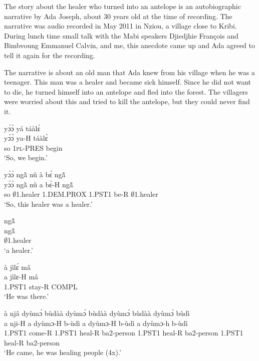 The story about the healer who turned into an antelope is an autobiographic narrative by Ada Joseph, about 30 years old at the time of recording. The narrative was audio recorded in May 2011 in Nziou, a village close to Kribi. During lunch time small talk with the Mabi speakers Djiedjhie François and Bimbvoung Emmanuel Calvin, and me, this anecdote came up and Ada agreed to tell it again for the recording. 

The narrative is about an old man that Ada knew from his village when he was a teenager. This man was a healer and became sick himself. Since he did not want to die, he turned himself into an antelope and fled into the forest. The villagers were worried about this and tried to kill the  antelope, but they could never find it.


\begin{exe} 
\exA\label{01}
  \glll    yɔ́ɔ̀ yá táàlɛ̀  \\
          yɔ́ɔ̀ ya-H táàlɛ̀  \\
            so 1\textsc{pl}-PRES begin     \\
    \trans `So, we begin.'
\end{exe}

\begin{exe} 
\exA\label{02}
  \glll   yɔ́ɔ̀ ngã̀ nû à bɛ́ ngã̂  \\
          yɔ́ɔ̀ ngã̀ nû a bɛ̀-H ngã̂ \\
         so $\emptyset$1.healer 1.DEM.PROX 1.PST1 be-R $\emptyset$1.healer   \\
    \trans `So, this healer was a healer.'
\end{exe}

\begin{exe} 
\exA\label{03}
  \glll  ngã̂    \\
          ngã̂   \\
          $\emptyset$1.healer       \\
    \trans `a healer.'
\end{exe}

\begin{exe} 
\exA\label{04}
  \glll  à jìlɛ́ mâ   \\
          a jìlɛ-H mâ   \\
         1.PST1 stay-R  COMPL       \\
    \trans `He was there.'
\end{exe}

\begin{exe} 
\exA\label{05}
  \glll  à njâ dyùmɔ́ bùdàà dyùmɔ́ bùdàà dyùmɔ́ bùdàà dyùmɔ́ bùdì  \\
           a nji-H a dyùmɔ-H b-ùdì a dyùmɔ-H  b-ùdì a dyùmɔ-h b-ùdì   \\
          1.PST1 come-R 1.PST1 heal-R ba2-person 1.PST1 heal-R ba2-person 1.PST1 heal-R ba2-person  \\
    \trans `He came, he was healing people (4x).'
\end{exe}

